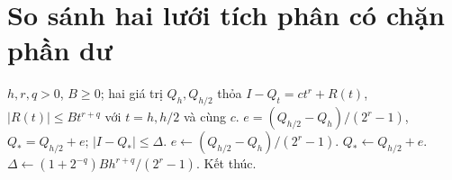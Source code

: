 \documentclass[12pt,a4paper,oneside]{book}
\numberwithin{algorithm}{chapter}
\theoremstyle{definition}
\begin{document}
\section{So sánh hai lưới tích phân có chặn phần dư}
\begin{algorithm}[H]
\caption{Tính chỉ số sai số và giá trị ngoại suy từ hai lưới}
\label{alg:quad-refinement-indicator}
\begin{algorithmic}[1]
\Require $h,r,q>0$, $B\geq0$; hai giá trị $Q_h,Q_{h/2}$ thỏa $I-Q_t=ct^r+R(t)$, $|R(t)|\leq Bt^{r+q}$ với $t=h,h/2$ và cùng $c$.
\Ensure $e=(Q_{h/2}-Q_h)/(2^r-1)$, $Q_*=Q_{h/2}+e$; $|I-Q_*|\leq\Delta$.
\State $e\gets(Q_{h/2}-Q_h)/(2^r-1)$.
\State $Q_*\gets Q_{h/2}+e$.
\State $\Delta\gets(1+2^{-q})Bh^{r+q}/(2^r-1)$.
\State Kết thúc.
\end{algorithmic}
\end{algorithm}

\end{document}

